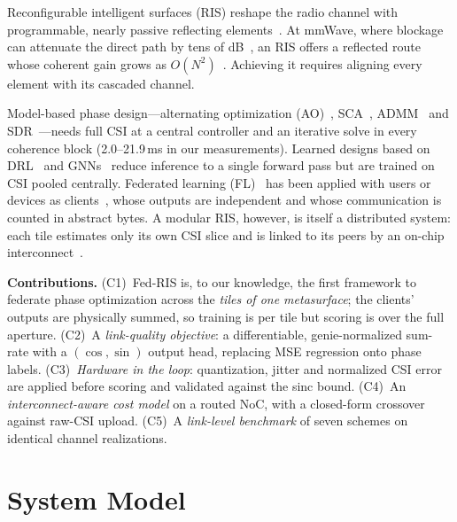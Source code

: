 \documentclass[conference]{IEEEtran}
\newcommand{\fedris}{Fed-RIS\xspace}
\begin{document}
Reconfigurable intelligent surfaces (RIS) reshape the radio channel with programmable, nearly passive reflecting elements~\cite{direnzo2020,basar2019}. At mmWave, where blockage can attenuate the direct path by tens of dB~\cite{rappaport2019}, an RIS offers a reflected route whose coherent gain grows as $O(N^2)$~\cite{wu2019joint}. Achieving it requires aligning every element with its cascaded channel.

Model-based phase design---alternating optimization (AO)~\cite{wu2019joint}, SCA~\cite{guo2020}, ADMM~\cite{boyd2011} and SDR~\cite{luo2010}---needs full CSI at a central controller and an iterative solve in every coherence block (2.0--21.9\,ms in our measurements). Learned designs based on DRL~\cite{huang2020drl} and GNNs~\cite{shen2021gnn,eisen2020} reduce inference to a single forward pass but are trained on CSI pooled centrally. Federated learning (FL)~\cite{mcmahan2017,li2020fedprox,karimireddy2020} has been applied with users or devices as clients~\cite{yang2020ota,elbir2022}, whose outputs are independent and whose communication is counted in abstract bytes. A modular RIS, however, is itself a distributed system: each tile estimates only its own CSI slice and is linked to its peers by an on-chip interconnect~\cite{benini2002,dally2004}.

\textbf{Contributions.} (C1)~\fedris is, to our knowledge, the first framework to federate phase optimization across the \emph{tiles of one metasurface}; the clients' outputs are physically summed, so training is per tile but scoring is over the full aperture. (C2)~A \emph{link-quality objective}: a differentiable, genie-normalized sum-rate with a $(\cos,\sin)$ output head, replacing MSE regression onto phase labels. (C3)~\emph{Hardware in the loop}: quantization, jitter and normalized CSI error are applied before scoring and validated against the sinc bound. (C4)~An \emph{interconnect-aware cost model} on a routed NoC, with a closed-form crossover against raw-CSI upload. (C5)~A \emph{link-level benchmark} of seven schemes on identical channel realizations.

\section{System Model}
\end{document}

